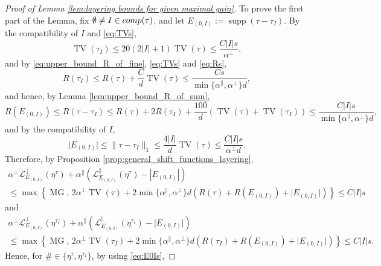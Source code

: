 \documentclass[11pt, reqno]{amsart}
\DeclareMathOperator{\supp}{supp}
\DeclareMathOperator{\TV}{TV}
\DeclareMathOperator{\MG}{MG}
\numberwithin{equation}{section}
\begin{document}
\begin{proof} [Proof of Lemma \ref{lem:layering bounds for given maximal gain}]
To prove the first part of the Lemma, fix $\emptyset\neq I\in {\rm comp}(\tau) $, and let $E_{(0,I)}:=\supp \left(\tau- \tau_{I}\right)$. 
By the compatibility of $I$ and \eqref{eq:TVs},
\begin{equation}\label{eq:TVIs}
\TV(\tau_I)\leq 20(2\lvert I\rvert+1)\TV(\tau)\leq\frac{C\lvert I\rvert s}{\alpha^{\perp}},
\end{equation}
and by \eqref{eq:upper_bound_R_of_fine}, \eqref{eq:TVs}
and \eqref{eq:Rs},\begin{equation}\label{eq:RIs}
R(\tau_I)\leq R(\tau)+\frac{C}{d}\TV(\tau)\leq \frac{C s}{\min\{\alpha^{\parallel},\alpha^{\perp}\}d},
\end{equation}
and hence, by Lemma \ref{lem:upper_bound_R_of_sum},  
\begin{equation}\label{eq:RE0Is}
R\left(E_{(0,I)}\right)\leq R\left(\tau-\tau_I\right)\leq R\left(\tau\right)+2R\left(\tau_I\right)+\frac{100}{d}\left(\TV\left(\tau\right)+\TV\left(\tau_I\right)\right)\leq \frac{C\lvert I\rvert s}{\min\{\alpha^{\parallel},\alpha^{\perp}\}d},
\end{equation}
and by the compatibility of $I$, 
\begin{equation}\label{eq:E0Is}
\lvert E_{(0,I)}\rvert\leq\lVert \tau-\tau_I\rVert_1\leq\frac{4\lvert I\rvert}{d}\TV(\tau)\leq \frac{C \lvert I\rvert s}{\alpha^{\perp}d}.
\end{equation}
Therefore, by Proposition \ref{prop:general_shift_functions_layering},
\begin{multline*}
\alpha^{\perp}\mathcal{L}^{\perp}_{E_{(0,I)}}(\eta^{\tau})+ \alpha^{\parallel} \left( \mathcal{L}^{\parallel}_{E_{(0,I)}}(\eta^{\tau}) -|E_{(0,I)}| \right) \\
\leq \max\left\{  \MG,\, 2\alpha^{\perp}\TV\left(\tau\right)+2\min \{ \alpha^{\parallel}, \alpha^{\perp} \}d\left(R(\tau)+R\left(E_{(0,I)}\right)+\lvert E_{(0,I)}\rvert\right)\right\}\leq C\lvert I\rvert s
\end{multline*}
and
\begin{multline*}
\alpha^{\perp}\mathcal{L}^{\perp}_{E_{(0,I)}}(\eta^{\tau_{I}})+ \alpha^{\parallel} \left( \mathcal{L}^{\parallel}_{E_{(0,I)}}(\eta^{\tau_{I}}) -\lvert E_{(0,I)}\rvert \right) \\
\leq \max\left\{  \MG,\, 2\alpha^{\perp}\TV\left(\tau_I\right)+2\min \{ \alpha^{\parallel}, \alpha^{\perp} \}d\left(R(\tau_I)+R\left(E_{(0,I)}\right)+\lvert E_{(0,I)}\rvert\right)\right\}\leq C\lvert I\rvert s.
\end{multline*}
Hence, for $\# \in \{\eta^{\tau},\eta^{\tau_{I}}\}$, by using \eqref{eq:E0Is},

\end{proof}
\end{document}
